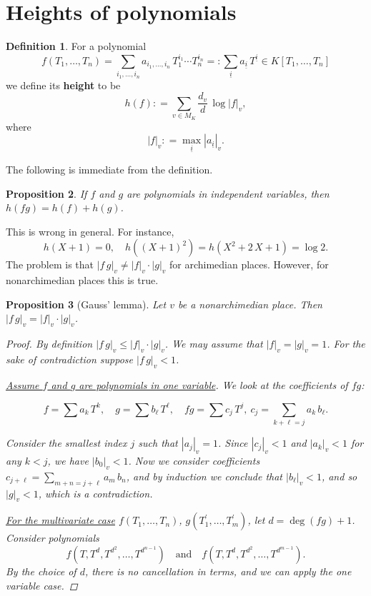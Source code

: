 \documentclass{article}
\newtheorem{proposition}{Proposition}[section]
\theoremstyle{definition}
\newtheorem{definition}[proposition]{Definition}
\newcommand{\term}{\textbf}
\newcommand{\dfn}{\mathrel{\mathop:}=}
\newcommand{\rdfn}{=\mathrel{\mathop:}}
\begin{document}
\section{Heights of polynomials}

\begin{definition}
  For a polynomial
  \[ f (T_1, \ldots, T_n) =
    \sum_{i_1, \ldots, i_n} a_{i_1,\ldots,i_n} \, T_1^{i_1}\cdots T_n^{i_n} \rdfn
    \sum_{\underline{i}} a_{\underline{i}} \, T^{\underline{i}} \in K [T_1,\ldots,T_n] \]
  we define its \term{height} to be
  \[ h (f) \dfn \sum_{v \in M_K} \frac{d_v}{d} \, \log |f|_v, \]
  where
  $$|f|_v \dfn \max_{\underline{i}} |a_{\underline{i}}|_v.$$
\end{definition}

The following is immediate from the definition.

\begin{proposition}
  If $f$ and $g$ are polynomials in independent variables, then
  $h (fg) = h(f) + h(g)$.
\end{proposition}

This is wrong in general. For instance,
$$h (X+1) = 0, \quad h ((X+1)^2) = h (X^2 + 2\,X + 1) = \log 2.$$
The problem is that $|f\,g|_v \ne |f|_v \cdot |g|_v$ for archimedian
places. However, for nonarchimedian places this is true.

\begin{proposition}[Gauss' lemma]
  Let $v$ be a nonarchimedian place. Then $|f\,g|_v = |f|_v \cdot |g|_v$.

  \begin{proof}
    By definition $|f\,g|_v \le |f|_v\cdot |g|_v$. We may assume that
    $|f|_v = |g|_v = 1$. For the sake of contradiction suppose $|f\,g|_v < 1$.

    \noindent\underline{Assume $f$ and $g$ are polynomials in one variable}. We
    look at the coefficients of $fg$:

    \[ f = \sum a_k\,T^k, \quad
      g = \sum b_\ell\,T^\ell, \quad
      fg = \sum c_j\,T^j, ~ c_j = \sum_{k + \ell = j} a_k\,b_\ell. \]

    Consider the smallest index $j$ such that $|a_j|_v = 1$. Since $|c_j|_v < 1$
    and $|a_k|_v < 1$ for any $k < j$, we have $|b_0|_v < 1$. Now we consider
    coefficients $c_{j+\ell} = \sum_{m+n = j+\ell} a_m\,b_n$, and by induction
    we conclude that $|b_\ell|_v < 1$, and so $|g|_v < 1$, which is a
    contradiction.

    \vspace{1em}

    \noindent\underline{For the multivariate case} $f (T_1,\ldots,T_n)$,
    $g (T_1^\prime, \ldots, T_m^\prime)$, let $d = \deg (fg) + 1$. Consider
    polynomials
    \[ f (T, T^d, T^{d^2}, \ldots, T^{d^{n-1}}) \quad
      \text{and} \quad
      f (T, T^d, T^{d^2}, \ldots, T^{d^{m-1}}). \]
    By the choice of $d$, there is no cancellation in terms, and we can apply
    the one variable case.
  \end{proof}
\end{proposition}
\end{document}
